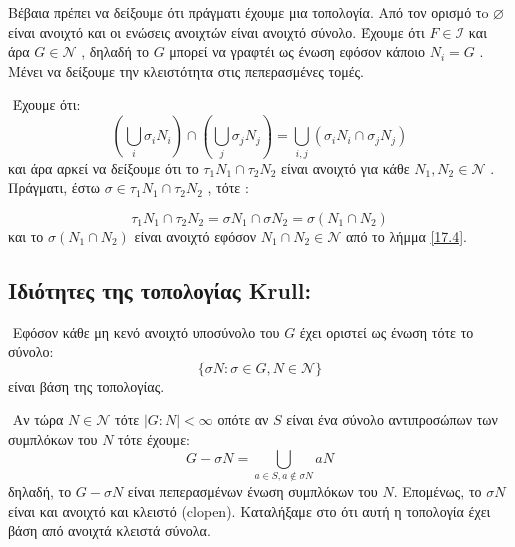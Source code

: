 \documentclass[oneside,a4paper]{article}
\newcommand {\tl}{\textlatin}
\begin{document}
\noindent Βέβαια πρέπει να δείξουμε ότι πράγματι έχουμε μια τοπολογία. Από τον ορισμό τo $\varnothing$ είναι ανοιχτό και οι ενώσεις ανοιχτών είναι ανοιχτό σύνολο. Έχουμε ότι $F \in \mathcal{I}$ και άρα $G \in \mathcal{N}$ , δηλαδή το $G$ μπορεί να γραφτέι ως ένωση εφόσον κάποιο $N_i = G$ . Μένει να δείξουμε την κλειστότητα στις πεπερασμένες τομές.

$ $\newline
Έχουμε ότι: 
$$\left(\bigcup_i \sigma_i N_i \right) \cap \left(\bigcup_j \sigma_j N_j \right) = \bigcup_{i, j} \left( \sigma_i N_i \cap \sigma_j N_j \right)$$
και άρα αρκεί να δείξουμε ότι το $\tau_1 N_1 \cap \tau_2 N_2$ είναι ανοιχτό για κάθε $N_1, N_2 \in \mathcal{N}$ . Πράγματι, έστω $\sigma \in \tau_1 N_1 \cap \tau_2 N_2$ , τότε :

$$\tau_1 N_1 \cap \tau_2 N_2 = \sigma N_1 \cap \sigma N_2 = \sigma (N_1 \cap N_2)$$
και το $\sigma (N_1 \cap N_2)$ είναι ανοιχτό εφόσον $N_1 \cap N_2 \in \mathcal{N}$ από το λήμμα \ref{17.4}.

\subsection{Ιδιότητες της τοπολογίας \tl{Krull}:}

$ $\newline
\noindent Εφόσον κάθε μη κενό ανοιχτό υποσύνολο του $G$ έχει οριστεί ως ένωση τότε το σύνολο:
$$\{\sigma N : \sigma \in G , N \in \mathcal{N} \}$$
είναι βάση της τοπολογίας.

$ $\newline
\noindent Αν τώρα $N \in \mathcal{N}$ τότε $|G:N|<\infty$ οπότε αν $S$ είναι ένα σύνολο αντιπροσώπων των συμπλόκων του $N$ τότε έχουμε:
$$G-\sigma N = \bigcup\limits_{a\in S, a\not\in \sigma N} aN$$
δηλαδή, το $G-\sigma N$ είναι πεπερασμένων ένωση συμπλόκων του $N$. Επομένως, το $\sigma N$ είναι και ανοιχτό και κλειστό (\tl{clopen}).
Καταλήξαμε στο ότι αυτή η τοπολογία έχει βάση από ανοιχτά κλειστά σύνολα.
\end{document}
